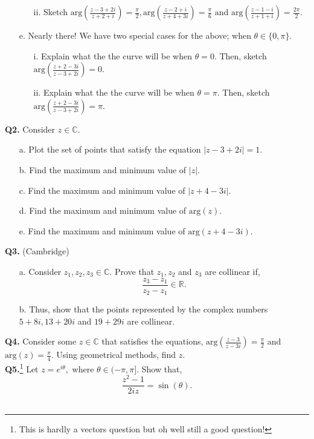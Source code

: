 \documentclass{article}
\begin{document}
\begin{enumerate}
\begin{enumerate}
        \item[ii.] Sketch $\text{arg}(\frac{z-3+2i}{z+2+i})=\frac{\pi}{2}, \text{arg}(\frac{z-2+i}{z+4+3i})=\frac{\pi}{6} \text{ and } \text{arg}(\frac{z-1-i}{z+1+i})=\frac{2\pi}{2}.$
    \end{enumerate}
    \item[e.] Nearly there! We have two special cases for the above; when $\theta \in \{ 0, \pi \}.$
    \begin{enumerate}
        \item[i.] Explain what the the curve will be when $\theta = 0.$ Then, sketch $\text{arg}(\frac{z+2-3i}{z-3+2i}) = 0.$
        \item[ii.] Explain what the the curve will be when $\theta = \pi.$ Then, sketch $\text{arg}(\frac{z+2-3i}{z-3+2i}) = \pi.$
    \end{enumerate}
\end{enumerate}

\textbf{Q2.} Consider $z\in \mathbb{C}.$
\begin{enumerate}
    \item[a.] Plot the set of points that satisfy the equation $|z-3+2i|=1.$
    \item[b.] Find the maximum and minimum value of $|z|.$
    \item[c.] Find the maximum and minimum value of $|z+4-3i|.$
    \item[d.] Find the maximum and minimum value of $\text{arg}(z).$
    \item[e.] Find the maximum and minimum value of $\text{arg}(z+4-3i).$
\end{enumerate}

\textbf{Q3.} (Cambridge)
\begin{enumerate}
    \item[a.] Consider $z_1, z_2, z_3 \in \mathbb{C}.$ Prove that $z_1, z_2$ and $z_3$ are collinear if, $$\frac{z_3-z_1}{z_2-z_1}\in \mathbb{R}.$$
    \item[b.] Thus, show that the points represented by the complex numbers $5+8i, 13+20i$ and $19+29i$ are collinear.
\end{enumerate}

\textbf{Q4.} Consider some $z\in \mathbb{C}$ that satisfies the equations, $\text{arg}(\frac{z-3}{z-3i})=\frac{\pi}{2}$ and $\text{arg}(z)=\frac{\pi}{4}.$ Using geometrical methods, find $z.$ \\

\textbf{Q5.}\footnote{This is hardly a vectors question but oh well still a good question!} Let $z = e^{i\theta},$ where $\theta \in (-\pi,\pi].$ Show that,
$$\frac{z^2-1}{2iz} = \sin{(\theta)}.$$ \\
\end{document}
